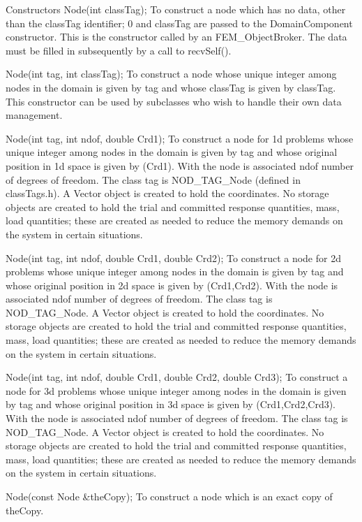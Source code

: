   Constructors  
  Node(int classTag);  
To construct a node which has no data, other than the  classTag
identifier; 0 and  classTag are passed to the DomainComponent
constructor. This is the constructor called by an
FEM_ObjectBroker. The data must be filled in subsequently by a call
to  recvSelf().  

  Node(int tag, int classTag);  
To construct a node whose unique integer among nodes in the
domain is given by  tag and whose classTag is given by 
classTag. This constructor can be used by 
subclasses who wish to handle their own data management.  

  Node(int tag, int ndof, double Crd1);  
To construct a node for 1d problems whose unique integer among nodes in the
domain is given by  tag and whose original position in 1d space
is given by (Crd1). With the node is associated  ndof number
of degrees of freedom. The class tag is NOD_TAG_Node (defined in
classTags.h). A Vector object is created to hold the coordinates. No
storage objects are created to hold the trial and committed response
quantities, mass, load quantities; these are created as needed to
reduce the memory demands on the system in certain situations.  

  Node(int tag, int ndof, double Crd1, double Crd2);  
To construct a node for 2d problems whose unique integer among nodes in the
domain is given by  tag and whose original position in 2d space
is given by (Crd1,Crd2). With the node is associated  ndof number
of degrees of freedom. The class tag is NOD_TAG_Node. A Vector object
is created to hold the coordinates. No
storage objects are created to hold the trial and committed response
quantities, mass, load quantities; these are created as needed to
reduce the memory demands on the system in certain situations.  

  Node(int tag, int ndof, double Crd1, double Crd2, double Crd3);
To construct a node for 3d problems whose unique integer among nodes in the
domain is given by  tag and whose original position in 3d space
is given by (Crd1,Crd2,Crd3). With the node is associated  ndof number
of degrees of freedom. The class tag is NOD_TAG_Node. A Vector object
is created to hold the coordinates. No
storage objects are created to hold the trial and committed response
quantities, mass, load quantities; these are created as needed to
reduce the memory demands on the system in certain situations.  



  Node(const Node &theCopy);
To construct a node which is an exact copy of  theCopy. 

